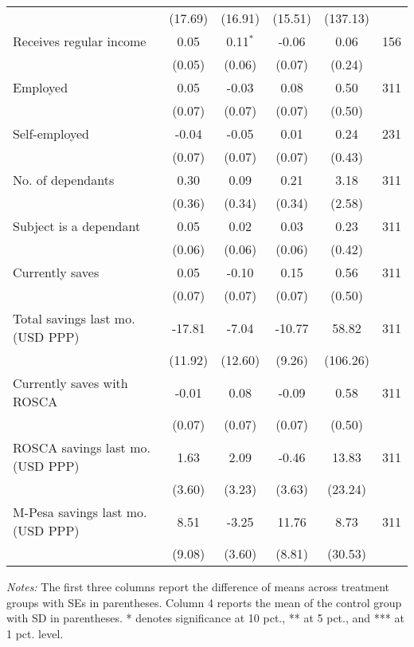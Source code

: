 \begin{table}[h]
{\begin{threeparttable}
\begin{tabular}{l*{5}{c}}
          &  (17.69)&  (16.91)&  (15.51)& (137.13)&         \\
Receives regular income&     0.05&0.11$^{*}$&    -0.06&     0.06&      156\\
          &   (0.05)&   (0.06)&   (0.07)&   (0.24)&         \\
Employed  &     0.05&    -0.03&     0.08&     0.50&      311\\
          &   (0.07)&   (0.07)&   (0.07)&   (0.50)&         \\
Self-employed&    -0.04&    -0.05&     0.01&     0.24&      231\\
          &   (0.07)&   (0.07)&   (0.07)&   (0.43)&         \\
No. of dependants&     0.30&     0.09&     0.21&     3.18&      311\\
          &   (0.36)&   (0.34)&   (0.34)&   (2.58)&         \\
Subject is a dependant&     0.05&     0.02&     0.03&     0.23&      311\\
          &   (0.06)&   (0.06)&   (0.06)&   (0.42)&         \\
Currently saves&     0.05&    -0.10&     0.15&     0.56&      311\\
          &   (0.07)&   (0.07)&   (0.07)&   (0.50)&         \\
Total savings last mo. (USD PPP)&   -17.81&    -7.04&   -10.77&    58.82&      311\\
          &  (11.92)&  (12.60)&   (9.26)& (106.26)&         \\
Currently saves with ROSCA&    -0.01&     0.08&    -0.09&     0.58&      311\\
          &   (0.07)&   (0.07)&   (0.07)&   (0.50)&         \\
ROSCA savings last mo. (USD PPP)&     1.63&     2.09&    -0.46&    13.83&      311\\
          &   (3.60)&   (3.23)&   (3.63)&  (23.24)&         \\
M-Pesa savings last mo. (USD PPP)&     8.51&    -3.25&    11.76&     8.73&      311\\
          &   (9.08)&   (3.60)&   (8.81)&  (30.53)&         \\
\bottomrule \end{tabular} \begin{tablenotes}[flushleft] \footnotesize \item \emph{Notes:} The first three columns report the difference of means across treatment groups with SEs in parentheses. Column 4 reports the mean of the control group with SD in parentheses. * denotes significance at 10 pct., ** at 5 pct., and *** at 1 pct. level. \end{tablenotes} \end{threeparttable} } \end{table}

